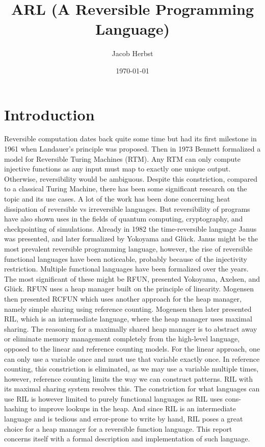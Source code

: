 \documentclass[a4paper]{article}
\author{Jacob Herbst}
\date{\today}
\title{ARL (A Reversible Programming Language)}
\begin{document}
\maketitle

\section{Introduction}
\label{sec:org2b09096}
Reversible computation dates back quite some time but had its first milestone in 1961 when Landauer's principle was proposed\cite{L61}. Then in 1973 Bennett\cite{B73} formalized a model for Reversible Turing Machines (RTM). Any RTM can only compute injective functions as any input must map to exactly one unique output. Otherwise, reversibility would be ambiguous. Despite this constriction, compared to a classical Turing Machine, there has been some significant research on the topic and its use cases. A lot of the work has been done concerning heat dissipation of reversible vs irreversible languages. But reversibility of programs have also shown uses in the fields of quantum computing, cryptography, and checkpointing of simulations\cite{Schordan2020}. Already in 1982 the time-reversible language Janus was presented, and later formalized by Yokoyama and Glück\cite{}. Janus might be the most prevalent reversible programming language, however, the rise of reversible functional languages have been noticeable, probably because of the injectivity restriction. Multiple functional languages have been formalized over the years. The most significant of these might be RFUN, presented Yokoyama, Axelsen, and Glück\cite{YokoyamaAxelsenGluck:2011}. RFUN uses a heap manager built on the principle of linearity. Mogensen then presented RCFUN\cite{Mogensen:RC2014} which uses another approach for the heap manager, namely simple sharing using reference counting. Mogensen then later presented RIL, which is an intermediate language, where the heap manager uses maximal sharing\cite{Mogensen2018ReversibleGC}. The reasoning for a maximally shared heap manager is to abstract away or eliminate memory management completely from the high-level language, opposed to the linear and reference counting models. For the linear approach, one can only use a variable once and must use that variable exactly once. In reference counting, this constriction is eliminated, as we may use a variable multiple times, however, reference counting limits the way we can construct patterns. RIL with its maximal sharing system resolves this. The constriction for what languages can use RIL is however limited to purely functional languages as RIL uses cons-hashing to improve lookups in the heap. And since RIL is an intermediate language and is tedious and error-prone to write by hand, RIL poses a great choice for a heap manager for a reversible function language. This report concerns itself with a formal description and implementation of such language.
\end{document}
